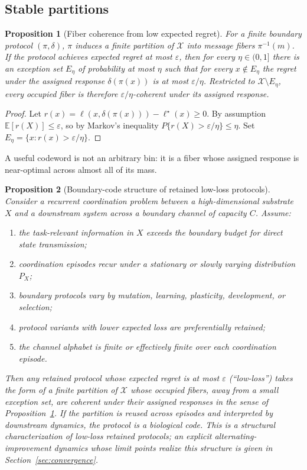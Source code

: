 \documentclass[12pt]{article}
\newtheorem{proposition}{Proposition}
\theoremstyle{definition}
\newcommand{\X}{\mathcal{X}}
\newcommand{\E}{\mathbb{E}}
\newcommand{\C}{C}
\newcommand{\loss}{\ell}
\newcommand{\eps}{\varepsilon}
\begin{document}
\subsection{Stable partitions}

\begin{proposition}[Fiber coherence from low expected regret]
\label{prop:partition}
For a finite boundary protocol $(\pi,\delta)$, $\pi$ induces a finite partition of $\X$ into message fibers $\pi^{-1}(m)$. If the protocol achieves expected regret at most $\eps$, then for every $\eta\in(0,1]$ there is an exception set $E_\eta$ of probability at most $\eta$ such that for every $x\notin E_\eta$ the regret under the assigned response $\delta(\pi(x))$ is at most $\eps/\eta$. Restricted to $\X\setminus E_\eta$, every occupied fiber is therefore $\eps/\eta$-coherent under its assigned response.
\end{proposition}

\begin{proof}
Let $r(x)=\loss(x,\delta(\pi(x)))-\loss^\star(x)\geq 0$. By assumption $\E[r(X)]\leq\eps$, so by Markov's inequality $P\{r(X)>\eps/\eta\}\leq\eta$. Set $E_\eta=\{x:r(x)>\eps/\eta\}$.
\end{proof}

A useful codeword is not an arbitrary bin: it is a fiber whose assigned response is near-optimal across almost all of its mass.

\begin{proposition}[Boundary-code structure of retained low-loss protocols]
\label{prop:boundarycode}
Consider a recurrent coordination problem between a high-dimensional substrate $X$ and a downstream system across a boundary channel of capacity $\C$. Assume:
\begin{enumerate}
\item the task-relevant information in $X$ exceeds the boundary budget for direct state transmission;
\item coordination episodes recur under a stationary or slowly varying distribution $P_X$;
\item boundary protocols vary by mutation, learning, plasticity, development, or selection;
\item protocol variants with lower expected loss are preferentially retained;
\item the channel alphabet is finite or effectively finite over each coordination episode.
\end{enumerate}
Then any retained protocol whose expected regret is at most $\eps$ (``low-loss'') takes the form of a finite partition of $\X$ whose occupied fibers, away from a small exception set, are coherent under their assigned responses in the sense of Proposition~\ref{prop:partition}. If the partition is reused across episodes and interpreted by downstream dynamics, the protocol is a biological code. This is a structural characterization of low-loss retained protocols; an explicit alternating-improvement dynamics whose limit points realize this structure is given in Section~\ref{sec:convergence}.
\end{proposition}
\end{document}
